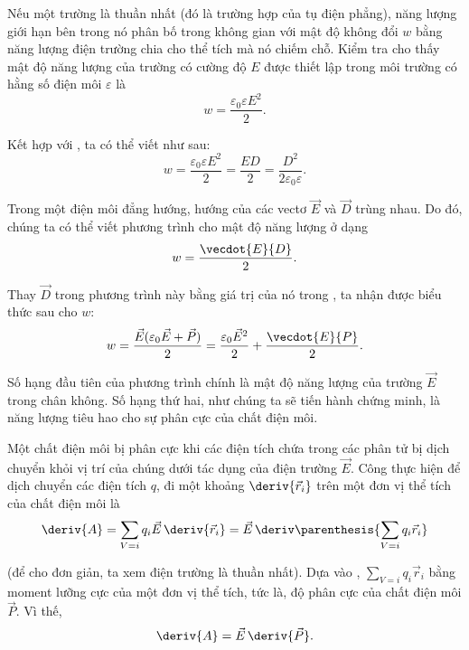 Nếu một trường là thuần nhất (đó là trường hợp của tụ điện phẳng), năng lượng giới hạn bên trong nó phân bố trong không gian với mật độ không đổi $w$ bằng năng lượng điện trường chia cho thể tích mà nó chiếm chỗ. Kiểm tra  cho thấy mật độ năng lượng của trường có cường độ $E$ được thiết lập trong môi trường có hằng số điện môi $\varepsilon$ là
\begin{equation}\label{eq:4_10}
	w = \frac{\varepsilon_0 \varepsilon E^2}{2}.
\end{equation}

\noindent
Kết hợp với , ta có thể viết  như sau:
\begin{equation}\label{eq:4_11}
	w = \frac{\varepsilon_0 \varepsilon E^2}{2} = \frac{E D}{2} = \frac{D^2}{2 \varepsilon_0 \varepsilon}.
\end{equation}

Trong một điện môi đẳng hướng, hướng của các vectơ $\vec{E}$ và $\vec{D}$ trùng nhau. Do đó, chúng ta có thể viết phương trình cho mật độ năng lượng ở dạng
\begin{equation*}
	w = \frac{\vecdot{E}{D}}{2}.
\end{equation*}

\noindent
Thay $\vec{D}$ trong phương trình này bằng giá trị của nó trong , ta nhận được biểu thức sau cho $w$:
\begin{equation}\label{eq:4_12}
	w = \frac{\vec{E} (\varepsilon_0 \vec{E} + \vec{P})}{2} = \frac{\varepsilon_0 \vec{E}^2}{2} + \frac{\vecdot{E}{P}}{2}.
\end{equation}

\noindent
Số hạng đầu tiên của phương trình chính là mật độ năng lượng của trường $\vec{E}$ trong chân không. Số hạng thứ hai, như chúng ta sẽ tiến hành chứng minh, là năng lượng tiêu hao cho sự phân cực của chất điện môi.

Một chất điện môi bị phân cực khi các điện tích chứa trong các phân tử bị dịch chuyển khỏi vị trí của chúng dưới tác dụng của điện trường $\vec{E}$. Công thực hiện để dịch chuyển các điện tích $q$, đi một khoảng $\deriv{\vec{r}_i}$ trên một đơn vị thể tích của chất điện môi là
\begin{equation*}
	\deriv{A} = \sum_{V=i} q_i \vec{E}\, \deriv{\vec{r}_i} = \vec{E}\, \deriv\parenthesis{\sum_{V=i} q_i \vec{r}_i}
\end{equation*}

\noindent
(để cho đơn giản, ta xem điện trường là thuần nhất). Dựa vào , $\sum_{V=i}q_i\vec{r}_i$ bằng moment lưỡng cực của một đơn vị thể tích, tức là, độ phân cực của chất điện môi $\vec{P}$. Vì thế,
\begin{equation}\label{eq:4_13}
	\deriv{A} = \vec{E}\, \deriv{\vec{P}}.
\end{equation}


